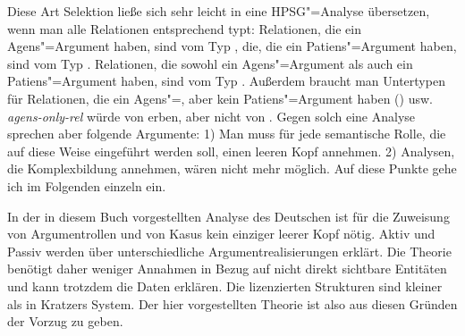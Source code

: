 {Diese Art Selektion ließe sich sehr leicht in eine HPSG"=Analyse übersetzen, wenn man
alle Relationen entsprechend typt: Relationen, die ein Agens"=Argument haben, sind vom Typ
, die, die ein Patiens"=Argument haben, sind vom Typ .
Relationen, die sowohl ein Agens"=Argument als auch ein Patiens"=Argument haben, sind
vom Typ . Außerdem braucht man Untertypen für Relationen, die
ein Agens"=, aber kein Patiens"=Argument haben () usw. \emph{agens-only-rel}
würde von  erben, aber nicht von . Gegen solch eine Analyse
sprechen aber folgende Argumente: 1) Man muss für jede semantische Rolle, die auf diese Weise
eingeführt werden soll, einen leeren Kopf annehmen. 
2) Analysen, die Komplexbildung annehmen, wären nicht mehr möglich. Auf diese Punkte gehe ich im Folgenden einzeln ein. 

In der in diesem Buch vorgestellten Analyse des Deutschen ist für die Zuweisung
von Argumentrollen und von Kasus kein einziger leerer Kopf nötig. Aktiv und Passiv
werden über unterschiedliche Argumentrealisierungen erklärt. Die Theorie benötigt
daher weniger Annahmen in Bezug auf nicht direkt sichtbare Entitäten und kann trotzdem
die Daten erklären. Die lizenzierten Strukturen sind kleiner als in Kratzers System.
Der hier vorgestellten Theorie ist also aus diesen Gründen der Vorzug zu geben.%


}
